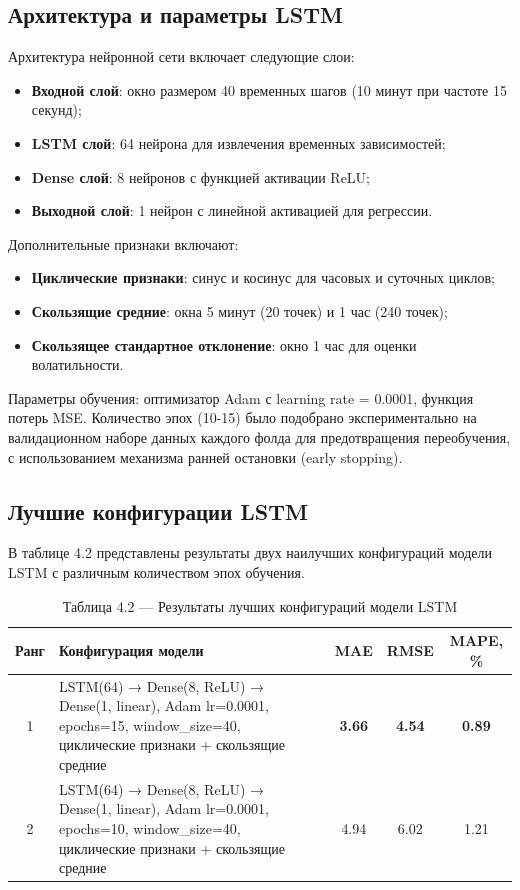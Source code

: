 \subsection{Архитектура и параметры LSTM}

Архитектура нейронной сети включает следующие слои:
\begin{itemize}
	\item \textbf{Входной слой}: окно размером 40 временных шагов (10 минут при частоте 15 секунд);
	\item \textbf{LSTM слой}: 64 нейрона для извлечения временных зависимостей;
	\item \textbf{Dense слой}: 8 нейронов с функцией активации ReLU;
	\item \textbf{Выходной слой}: 1 нейрон с линейной активацией для регрессии.
\end{itemize}

Дополнительные признаки включают:
\begin{itemize}
	\item \textbf{Циклические признаки}: синус и косинус для часовых и суточных циклов;
	\item \textbf{Скользящие средние}: окна 5 минут (20 точек) и 1 час (240 точек);
	\item \textbf{Скользящее стандартное отклонение}: окно 1 час для оценки волатильности.
\end{itemize}

Параметры обучения: оптимизатор Adam с learning rate = 0.0001, функция потерь MSE. Количество эпох (10-15) было подобрано экспериментально на валидационном наборе данных каждого фолда для предотвращения переобучения, с использованием механизма ранней остановки (early stopping).

\subsection{Лучшие конфигурации LSTM}

В таблице 4.2 представлены результаты двух наилучших конфигураций модели LSTM с различным количеством эпох обучения.

\begin{table}[H]
	\centering
	\caption*{Таблица 4.2 --- Результаты лучших конфигураций модели LSTM}
	\begin{tabular}{|c|p{8cm}|c|c|c|}
		\hline
		\textbf{Ранг} & \textbf{Конфигурация модели} & \textbf{MAE} & \textbf{RMSE} & \textbf{MAPE, \%} \\
		\hline
		1 & LSTM(64) → Dense(8, ReLU) → Dense(1, linear), Adam lr=0.0001, epochs=15, window\_size=40, циклические признаки + скользящие средние & \textbf{3.66} & \textbf{4.54} & \textbf{0.89} \\
		\hline
		2 & LSTM(64) → Dense(8, ReLU) → Dense(1, linear), Adam lr=0.0001, epochs=10, window\_size=40, циклические признаки + скользящие средние & 4.94 & 6.02 & 1.21 \\
		\hline
	\end{tabular}
	\label{tab:lstm_results}
\end{table}

